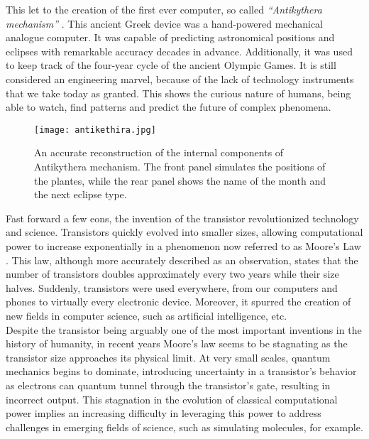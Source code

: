 \documentclass[12pt,a4paper]{report}
\begin{document}
\noindent
This let to the creation of the first ever computer, so called \textit{``Antikythera mechanism''} \cite{antikythera_mechanism}. This ancient Greek device was a hand-powered mechanical analogue computer. It was capable of predicting astronomical positions and eclipses with remarkable accuracy decades in advance. Additionally, it was used to keep track of the four-year cycle of the ancient Olympic Games. It is still considered an engineering marvel, because of the lack of technology instruments that we take today as granted. This shows the curious nature of humans, being able to watch, find patterns and predict the future of complex phenomena. \\

\begin{figure}[h]
    \centering
    \texttt{[image: antikethira.jpg]}
    \caption{An accurate reconstruction of the internal components of Antikythera mechanism. The front panel simulates the positions of the plantes, while the rear panel shows the name of the month and the next eclipse type.}
    \label{fig:Antikythera mechanism}
\end{figure}

\newpage
\noindent
Fast forward a few eons, the invention of the transistor revolutionized technology and science. Transistors quickly evolved into smaller sizes, allowing computational power to increase exponentially in a phenomenon now referred to as Moore's Law \cite{moores_law}. This law, although more accurately described as an observation, states that the number of transistors doubles approximately every two years while their size halves. Suddenly, transistors were used everywhere, from our computers and phones to virtually every electronic device. Moreover, it spurred the creation of new fields in computer science, such as artificial intelligence, etc.
\\

\noindent
Despite the transistor being arguably one of the most important inventions in the history of humanity, in recent years Moore's law seems to be stagnating as the transistor size approaches its physical limit. At very small scales, quantum mechanics begins to dominate, introducing uncertainty in a transistor's behavior as electrons can quantum tunnel through the transistor's gate, resulting in incorrect output. This stagnation in the evolution of classical computational power implies an increasing difficulty in leveraging this power to address challenges in emerging fields of science, such as simulating molecules, for example.
\\
\end{document}
